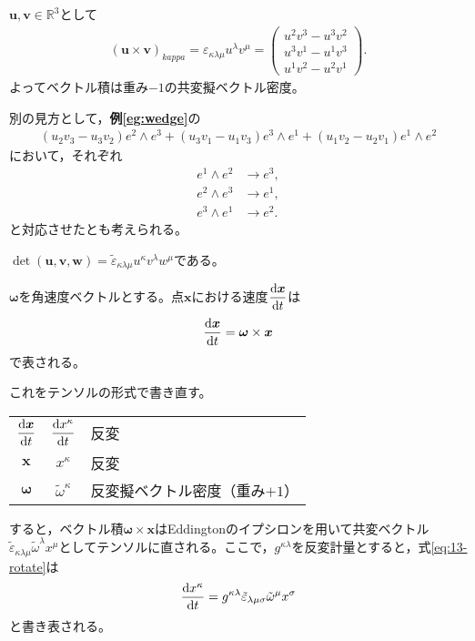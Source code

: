 \documentclass[uplatex]{jsarticle}
\begin{document}
\begin{rei}
  $\bm{u},\bm{v} \in \mathbb{R}^{3}$として
  \begin{align*}
    (\bm{u} \times \bm{v})_{kappa} = \varepsilon_{\kappa \lambda \mu} u^{\lambda} v^{\mu} = \begin{pmatrix}
      u^{2} v^{3} - u^{3} v^{2} \\
      u^{3} v^{1} - u^{1} v^{3} \\
      u^{1} v^{2} - u^{2} v^{1}
    \end{pmatrix}.
  \end{align*}
  よってベクトル積は重み$-1$の共変擬ベクトル密度。

  別の見方として，\textbf{例\ref{eg:wedge}}の
  \begin{align*}
    (u_{2}v_{3} - u_{3}v_{2}) e^{2} \wedge e^{3} + (u_{3}v_{1} - u_{1}v_{3}) e^{3} \wedge e^{1} + (u_{1}v_{2} - u_{2}v_{1}) e^{1} \wedge e^{2}
  \end{align*}
  において，それぞれ
  \begin{align*}
    e^{1} \wedge e^{2} &\to e^{3}, \\
    e^{2} \wedge e^{3} &\to e^{1}, \\
    e^{3} \wedge e^{1} &\to e^{2}.
  \end{align*}
  と対応させたとも考えられる。
\end{rei}

\begin{rei}
  $\det(\bm{u}, \bm{v}, \bm{w}) = \tilde{\varepsilon}_{\kappa\lambda\mu}u^{\kappa}v^{\lambda}w^{\mu}$である。
\end{rei}


\sukima{}\par
$\bm{\omega}$を角速度ベクトルとする。点$\bm{x}$における速度$\dfrac{\mathrm{d}\bm{x}}{\mathrm{d}t}$は
\begin{align}
  \label{eq:13-rotate}
  \dfrac{\mathrm{d}\bm{x}}{\mathrm{d}t} = \bm{\omega} \times \bm{x}
\end{align}
で表される。

これをテンソルの形式で書き直す。
\begin{center}
  \begin{tabular}{c@{$\longrightarrow$}c@{; }l}
    $\dfrac{\mathrm{d}\bm{x}}{\mathrm{d}t}$ & $\dfrac{\mathrm{d}x^{\kappa}}{\mathrm{d}t}$ & 反変 \\
    $\bm{x}$ & $x^{\kappa}$ & 反変 \\
    $\bm{\omega}$ & $\tilde{\omega}^{\kappa}$ & 反変擬ベクトル密度（重み$+1$）
  \end{tabular}
\end{center}
すると，ベクトル積$\bm{\omega} \times \bm{x}$はEddingtonのイプシロンを用いて共変ベクトル$\tilde{\varepsilon}_{\kappa\lambda\mu}\tilde{\omega}^{\lambda}x^{\mu}$としてテンソルに直される。ここで，$g^{\kappa\lambda}$を反変計量とすると，式\eqref{eq:13-rotate}は
\begin{align*}
  \dfrac{\mathrm{d}x^{\kappa}}{\mathrm{d}t} = g^{\kappa\lambda} \tilde{\varepsilon}_{\lambda\mu\sigma}\tilde{\omega}^{\mu}x^{\sigma}
\end{align*}
と書き表される。
\end{document}
